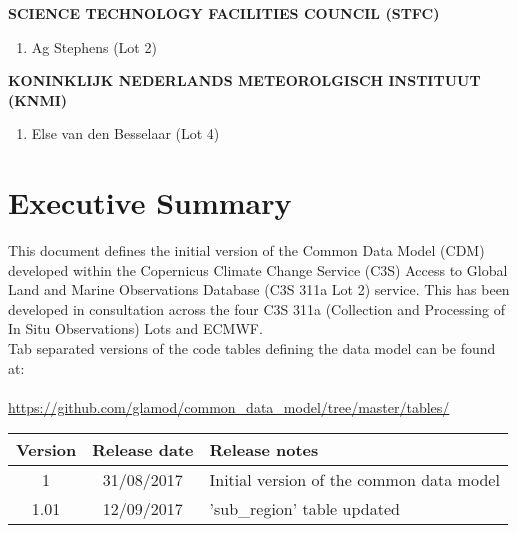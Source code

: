 \documentclass[a4paper,12pt]{article}
\begin{document}
\begin{adjustwidth}{2.cm}{}
{\fontsize{14}{17} \selectfont \textbf{\uppercase{Science Technology Facilities Council (STFC)}}}
\begin{enumerate}
\item Ag Stephens (Lot 2)\\
\end{enumerate}

{\fontsize{14}{17} \selectfont \textbf{\uppercase{Koninklijk Nederlands Meteorolgisch Instituut (KNMI)}}}
\begin{enumerate}
\item Else van den Besselaar (Lot 4)
\end{enumerate}

\end{adjustwidth}


\newpage

\section*{Executive Summary}
This document defines the initial version of the Common Data Model (CDM) developed within the Copernicus Climate Change Service (C3S) Access to Global Land and Marine Observations Database (C3S 311a Lot 2) service. This has been developed in consultation across the four C3S 311a (Collection and Processing of In Situ Observations) Lots and ECMWF.\\

Tab separated versions of the code tables defining the data model can be found at:\\ \\
\tabto{2cm} \url{https://github.com/glamod/common_data_model/tree/master/tables/}

\begin{table}[H]
\centering
\begin{tabular}{|c|c|l|}
\hline
\textbf{Version} & \textbf{Release date} & \textbf{Release notes}\\
\hline
1 & 31/08/2017 & Initial version of the common data model\\
1.01 & 12/09/2017 & 'sub\_region' table updated\\
\hline
\end{tabular}
\end{table}
\end{document}
